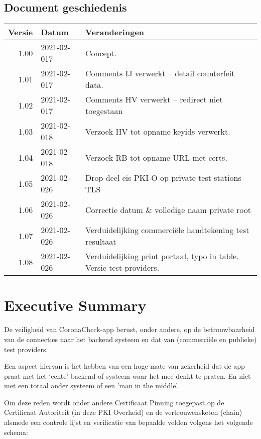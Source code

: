\documentclass[11.0pt]{report}
\def\CoronaCheckApp{CoronaCheck-app\xspace}
\begin{document}

\maketitle

\section*{Document geschiedenis}

\begin{tabular}{|r|l|l|}
\hline
Versie & Datum & Veranderingen \\
\hline
\hline
1.00 & 2021-02-017 & Concept. \\
\hline
1.01 & 2021-02-017 & Comments IJ verwerkt -- detail counterfeit data.\\
\hline
1.02 & 2021-02-017 & Comments HV verwerkt -- redirect niet toegestaan \\
\hline
1.03 & 2021-02-018 & Verzoek HV tot opname keyids verwerkt.  \\
\hline
1.04 & 2021-02-018 & Verzoek RB tot opname URL met certs.  \\
\hline
1.05 & 2021-02-026 & Drop deel eis PKI-O op private test stations TLS \\
\hline
1.06 & 2021-02-026 & Correctie datum \& volledige naam private root \\
\hline
1.07 & 2021-02-026 & Verduidelijking commerciële handtekening test resultaat \\
\hline
1.08 & 2021-02-026 & Verduidelijking print portaal, typo in table. Versie test providers. \\
\hline
\end{tabular}


\pagebreak
\chapter{Executive Summary}

De veiligheid van \CoronaCheckApp berust, onder andere, op de betrouwbaarheid van de connecties naar het backend systeem en dat van (commerciële en publieke) test providers.

Een aspect hiervan is het hebben van een hoge mate van zekerheid dat de app praat met het `echte' backend of systeem waar het mee denkt te praten. En niet met een totaal ander systeem of een 'man in the middle'.

Om deze reden wordt onder andere Certificaat Pinning toegepast op de Certificaat Autoriteit (in deze PKI Overheid) en de vertrouwensketen (chain) alsmede een controle lijst en verificatie van bepaalde velden volgens het volgende schema:
\end{document}
